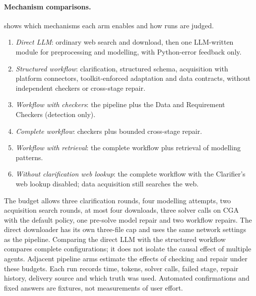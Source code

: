 \paragraph{Mechanism comparisons.}
 shows which mechanisms each arm enables and how runs are judged.
\begin{enumerate}
  \item \emph{Direct LLM}: ordinary web search and download, then one LLM-written module for preprocessing and
        modelling, with Python-error feedback only.
  \item \emph{Structured workflow}: clarification, structured schema, acquisition with platform connectors,
        toolkit-enforced adaptation and data contracts, without independent checkers or cross-stage repair.
  \item \emph{Workflow with checkers}: the pipeline plus the Data and Requirement Checkers (detection only).
  \item \emph{Complete workflow}: checkers plus bounded cross-stage repair.
  \item \emph{Workflow with retrieval}: the complete workflow plus retrieval of modelling patterns.
  \item \emph{Without clarification web lookup}: the complete workflow with the Clarifier's web lookup disabled;
        data acquisition still searches the web.
\end{enumerate}
The budget allows three clarification rounds, four modelling attempts, two acquisition search rounds, at most
four downloads, three solver calls on CGA with the default policy, one pre-solve model repair and two workflow
repairs. The direct downloader has its own three-file cap and uses the same network settings as the pipeline.
Comparing the direct LLM with the structured workflow compares complete configurations; it does not isolate the
causal effect of multiple agents. Adjacent pipeline arms estimate the effects of checking and repair under these
budgets. Each run records time, tokens, solver calls, failed stage, repair history, delivery source and which
truth was used. Automated confirmations and fixed answers are fixtures, not measurements of user effort.



